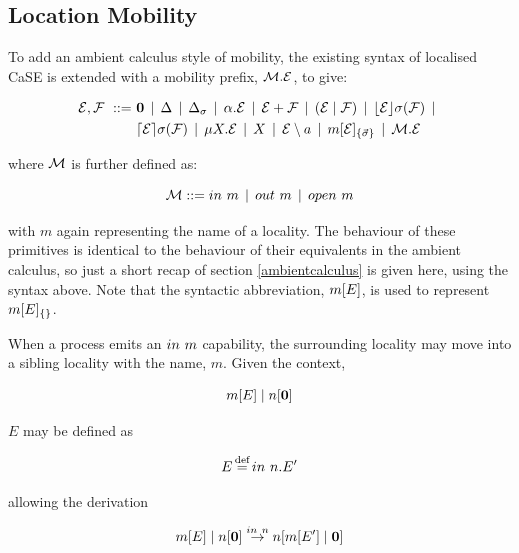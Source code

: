 \subsection{Location Mobility}
\label{locmob}

To add an ambient calculus style of mobility, the existing syntax of
localised CaSE is extended with a mobility prefix, $\text{$\mathcal{M}$} . \text{$\mathcal{E}$}$,
to give:

\begin{equation}
  \begin{aligned}
    \text{$\mathcal{E}$}, \text{$\mathcal{F}$} \ ::=\ &
    \textbf{0}  \;\,|\,\; 
    \Delta \;\,|\,\; 
    \Delta_{\sigma} \;\,|\,\; 
    \alpha . \text{$\mathcal{E}$}  \;\,|\,\;
    \text{$\mathcal{E}$} + \text{$\mathcal{F}$} \;\,|\,\; 
    (\text{$\mathcal{E}$}\;|\;\text{$\mathcal{F}$})\;\,|\,\; 
    \lfloor{\text{$\mathcal{E}$}}\rfloor {\sigma} ({\text{$\mathcal{F}$}}) \;\,|\,\; \\
    & \lceil{\text{$\mathcal{E}$}}\rceil {\sigma} ({\text{$\mathcal{F}$}}) \;\,|\,\; 
    \mu X . \text{$\mathcal{E}$} \;\,|\,\; 
    X \;\,|\,\; 
    \text{$\mathcal{E}$} \setminus a \;\,|\,\; 
    {m}[ \text{$\mathcal{E}$} ]_{\{\vec{\sigma}\}} \;\,|\,\;
    \text{$\mathcal{M}$} . \text{$\mathcal{E}$}
  \end{aligned}
\end{equation}

\noindent where $\text{$\mathcal{M}$}$ is further defined as:

\begin{equation}
    \text{$\mathcal{M}$} ::= in\ m \;\,|\,\; out\ m \;\,|\,\; open\ m
\end{equation}

\noindent with $m$ again representing the name of a locality.  The
behaviour of these primitives is identical to the behaviour of their
equivalents in the ambient calculus, so just a short recap of section
\ref{ambientcalculus} is given here, using the syntax above.  Note that
the syntactic abbreviation, ${m}[ E ]$, is used to represent
${m}[ E ]_{\{\}}$.

When a process emits an $in\ m$ capability, the surrounding locality
may move into a sibling locality with the name, $m$.  Given the context,

\begin{equation}
{m}[ E ]\;|\;{n}[ \textbf{0} ]
\end{equation}

\noindent $E$ may be defined as

\begin{equation}
E \operatorname{\stackrel{\textrm{def}}{=}} in\ n.E^\prime
\end{equation}

\noindent allowing the derivation

\begin{equation}
{m}[ E ]\;|\;{n}[ \textbf{0} ] \stackrel{in\ n}{\rightarrow} 
{n}[ {m}[ E^\prime ]\;|\;\textbf{0} ]
\end{equation}

